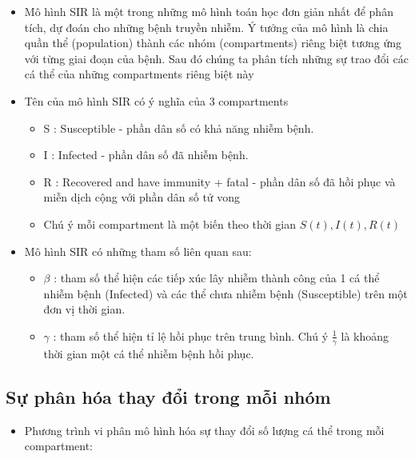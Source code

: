 \documentclass[11pt]{article}
\providecommand{\tightlist}{%
      \setlength{\itemsep}{0pt}\setlength{\parskip}{0pt}}
\begin{document}
\begin{itemize}
\tightlist
\item
  Mô hình SIR là một trong những mô hình toán học đơn giản nhất để phân
  tích, dự đoán cho những bệnh truyền nhiễm. Ý tưởng của mô hình là chia
  quần thể (population) thành các nhóm (compartments) riêng biệt tương
  ứng với từng giai đoạn của bệnh. Sau đó chúng ta phân tích những sự
  trao đổi các cá thể của những compartments riêng biệt này
\item
  Tên của mô hình SIR có ý nghĩa của 3 compartments

  \begin{itemize}
  \tightlist
  \item
    S : Susceptible - phần dân số có khả năng nhiễm bệnh.
  \item
    I : Infected - phần dân số đã nhiễm bệnh.
  \item
    R : Recovered and have immunity + fatal - phần dân số đã hồi phục và
    miễn dịch cộng với phần dân số tử vong
  \item
    Chú ý mỗi compartment là một biến theo thời gian \(S(t),I(t),R(t)\)
  \end{itemize}
\item
  Mô hình SIR có những tham số liên quan sau:

  \begin{itemize}
  \tightlist
  \item
    \(\beta\) : tham số thể hiện các tiếp xúc lây nhiễm thành công của 1
    cá thể nhiễm bệnh (Infected) và các thể chưa nhiễm bệnh
    (Susceptible) trên một đơn vị thời gian.
  \item
    \(\gamma\) : tham số thể hiện tỉ lệ hồi phục trên trung bình. Chú ý
    \(\frac{1}{\gamma}\) là khoảng thời gian một cá thể nhiễm bệnh hồi
    phục.
  \end{itemize}
\end{itemize}

\subsection{Sự phân hóa thay đổi trong mỗi
nhóm}\label{sux1b0-phuxe2n-hoa-thay-ux111uxf4i-trong-muxf4i-nhom}

\begin{itemize}
\tightlist
\item
  Phương trình vi phân mô hình hóa sự thay đổi số lượng cá thể trong mỗi
  compartment:
\end{itemize}
\end{document}
